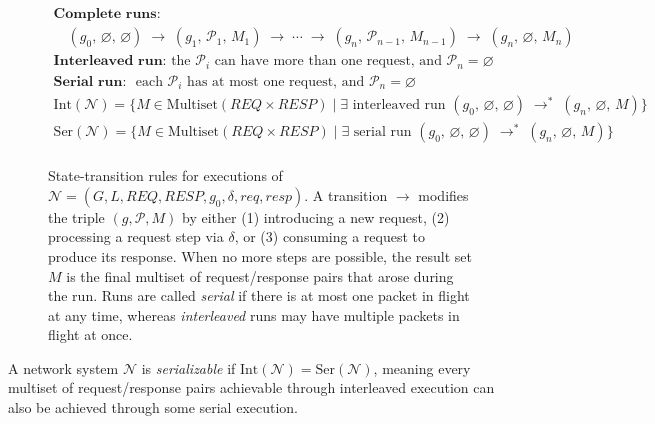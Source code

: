 \begin{figure}[t]
    \[
    \begin{array}{c}
    \textbf{Complete runs:}
    \\
    \quad (g_0,\,\varnothing,\,\varnothing) \;\longrightarrow\; (g_1,\,\mathcal{P}_1,\,M_1) \;\longrightarrow\; \cdots \;\longrightarrow\; (g_n,\,\mathcal{P}_{n-1},\,M_{n-1}) \;\longrightarrow\; (g_n,\,\varnothing,\,M_n)
    \\[1em]
    \textbf{Interleaved run: } \text{the } \mathcal{P}_i \text{ can have more than one request, and } \mathcal{P}_n = \varnothing \\
    \textbf{Serial run: } \text{ each } \mathcal{P}_i \text{ has at most one request, and } \mathcal{P}_n = \varnothing\\
    \text{Int}(\mathcal{N}) = \{ M \in \text{Multiset}(\mathit{REQ} \times \mathit{RESP}) \mid \exists \text{ interleaved run } (g_0,\,\varnothing,\,\varnothing) \;\longrightarrow^*\; (g_n,\,\varnothing,\,M) \}\\
    \text{Ser}(\mathcal{N}) = \{ M \in \text{Multiset}(\mathit{REQ} \times \mathit{RESP}) \mid \exists \text{ serial run } (g_0,\,\varnothing,\,\varnothing) \;\longrightarrow^*\; (g_n,\,\varnothing,\,M) \}\\
    \end{array}
    \]

    \caption{State-transition rules for executions of
    \(\mathcal{N} = (G, L, \mathit{REQ}, \mathit{RESP}, g_0, \delta, \mathit{req}, \mathit{resp})\).
    A transition \(\longrightarrow\) modifies the triple \((g,\mathcal{P}, M)\) by either (1) introducing a new request, (2) processing a request step via \(\delta\), or (3) consuming a request to produce its response.  When no more steps are possible, the result set \(M\) is the final multiset of request/response pairs that arose during the run.
    Runs are called \emph{serial} if there is at most one packet in flight at any time, whereas \emph{interleaved} runs may have multiple packets in flight at once.}
    \label{fig:network-transitions}
\end{figure}

\begin{definition}[Serializability]
A network system $\mathcal{N}$ is \emph{serializable} if $\text{Int}(\mathcal{N}) = \text{Ser}(\mathcal{N})$, meaning every multiset of request/response pairs achievable through interleaved execution can also be achieved through some serial execution.
\end{definition}


